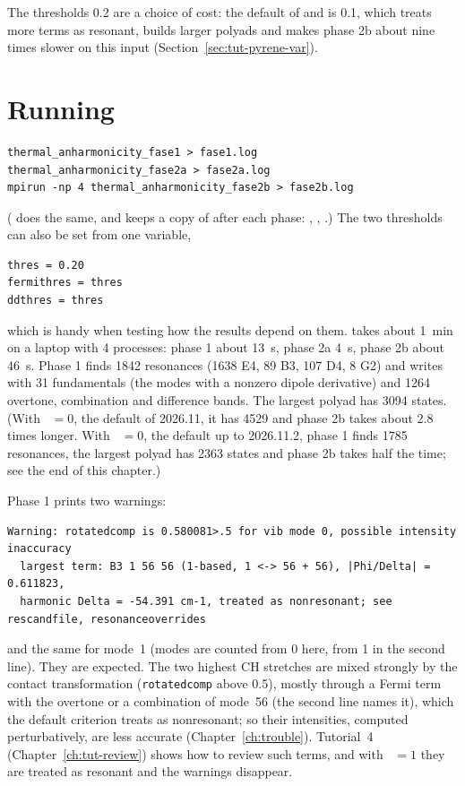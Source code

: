 The thresholds 0.2 are a choice of cost: the default of
 and  is 0.1, which treats more terms as
resonant, builds larger polyads and makes phase 2b about nine times
slower on this input (Section~\ref{sec:tut-pyrene-var}).

\section{Running}

\begin{lstlisting}
thermal_anharmonicity_fase1 > fase1.log
thermal_anharmonicity_fase2a > fase2a.log
mpirun -np 4 thermal_anharmonicity_fase2b > fase2b.log
\end{lstlisting}
( does the same, and keeps a copy of  after each
phase: , , .)
The two thresholds can also be set from one variable,
\begin{lstlisting}
thres = 0.20
fermithres = thres
ddthres = thres
\end{lstlisting}
which is handy when testing how the results depend on them.
 takes about 1~min on a laptop with 4 processes: phase 1
about 13~s, phase 2a 4~s, phase 2b about 46~s. Phase 1 finds 1842 resonances
(1638 E4, 89 B3, 107 D4, 8 G2) and writes  with 31
fundamentals (the modes with a nonzero dipole derivative) and 1264
overtone, combination and difference bands. The largest polyad has 3094
states. (With ~$=0$, the default of 2026.11, it has
4529 and phase 2b takes about 2.8 times longer. With
~$=0$, the default up to 2026.11.2, phase 1 finds 1785
resonances, the largest polyad has 2363 states and phase 2b takes half
the time; see the end of this chapter.)

Phase 1 prints two warnings:
\begin{lstlisting}
Warning: rotatedcomp is 0.580081>.5 for vib mode 0, possible intensity inaccuracy
  largest term: B3 1 56 56 (1-based, 1 <-> 56 + 56), |Phi/Delta| = 0.611823,
  harmonic Delta = -54.391 cm-1, treated as nonresonant; see rescandfile, resonanceoverrides
\end{lstlisting}
and the same for mode~1 (modes are counted from 0 here, from 1 in the
second line). They are expected. The two highest CH stretches are mixed
strongly by the contact transformation (\texttt{rotatedcomp} above 0.5),
mostly through a Fermi term with the overtone or a combination of mode~56
(the second line names it), which the default criterion treats as
nonresonant; so their intensities, computed perturbatively, are less
accurate (Chapter~\ref{ch:trouble}). Tutorial~4
(Chapter~\ref{ch:tut-review}) shows how to review such terms, and with
~$=1$ they are treated as resonant and the warnings
disappear.

